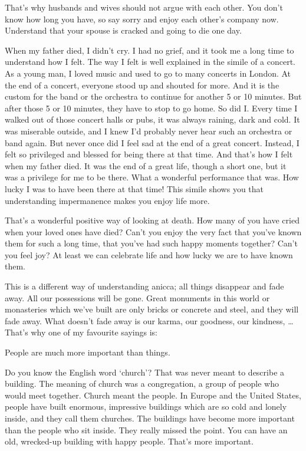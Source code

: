 \documentclass[12pt, openany]{book}
\newenvironment{aphorism}%
{%
\begin{center}\begin{itshape}
}%
{\end{itshape}\end{center}
}%
\begin{document}
That’s why husbands and wives should not argue with each other. You don’t know how long you have, so say sorry and enjoy each other’s company now. Understand that your spouse is cracked and going to die one day. 

When my father died, I didn’t cry. I had no grief, and it took me a long time to understand how I felt. The way I felt is well explained in the simile of a concert. As a young man, I loved music and used to go to many concerts in London. At the end of a concert, everyone stood up and shouted for more. And it is the custom for the band or the orchestra to continue for another 5 or 10 minutes. But after those 5 or 10 minutes, they have to stop to go home. So did I. Every time I walked out of those concert halls or pubs, it was always raining, dark and cold. It was miserable outside, and I knew I’d probably never hear such an orchestra or band again. But never once did I feel sad at the end of a great concert. Instead, I felt so privileged and blessed for being there at that time. And that’s how I felt when my father died. It was the end of a great life, though a short one, but it was a privilege for me to be there. What a wonderful performance that was. How lucky I was to have been there at that time! This simile shows you that understanding impermanence makes you enjoy life more. 

That’s a wonderful positive way of looking at death. How many of you have cried when your loved ones have died? Can’t you enjoy the very fact that you’ve known them for such a long time, that you’ve had such happy moments together? Can’t you feel joy? At least we can celebrate life and how lucky we are to have known them. 

This is a different way of understanding anicca; all things disappear and fade away. All our possessions will be gone. Great monuments in this world or monasteries which we’ve built are only bricks or concrete and steel, and they will fade away. What doesn’t fade away is our karma, our goodness, our kindness, … That’s why one of my favourite sayings is: 

\begin{aphorism}
People are much more important than things.
\end{aphorism}

Do you know the English word ‘church’? That was never meant to describe a building. The meaning of church was a congregation, a group of people who would meet together. Church meant the people. In Europe and the United States, people have built enormous, impressive buildings which are so cold and lonely inside, and they call them churches. The buildings have become more important than the people who sit inside. They really missed the point. You can have an old, wrecked-up building with happy people. That’s more important. 
\end{document}
